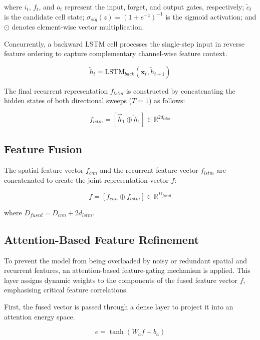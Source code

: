 \documentclass[a4paper,fleqn]{cas-sc}
\begin{document}
where $i_t$, $f_t$, and $o_t$ represent the input, forget, and output gates, respectively; $\tilde{c}_t$ is the candidate cell state; $\sigma_{sig}(z) = (1 + e^{-z})^{-1}$ is the sigmoid activation; and $\odot$ denotes element-wise vector multiplication.

Concurrently, a backward LSTM cell processes the single-step input in reverse feature ordering to capture complementary channel-wise feature context.

\begin{equation}
\overleftarrow{h}_t = \text{LSTM}_{back}(\mathbf{x}_t, \overleftarrow{h}_{t+1})
\end{equation}

The final recurrent representation $f_{lstm}$ is constructed by concatenating the hidden states of both directional sweeps ($T=1$) as follows:

\begin{equation}
f_{lstm} = [\overrightarrow{h}_1 \oplus \overleftarrow{h}_1] \in \mathbb{R}^{2 d_{lstm}}
\end{equation}

\subsection{Feature Fusion}

The spatial feature vector $f_{cnn}$ and the recurrent feature vector $f_{lstm}$ are concatenated to create the joint representation vector $f$:

\begin{equation}
f = [f_{cnn} \oplus f_{lstm}] \in \mathbb{R}^{D_{fused}}
\end{equation}

where $D_{fused} = D_{cnn} + 2 d_{lstm}$.

\subsection{Attention-Based Feature Refinement}

To prevent the model from being overloaded by noisy or redundant spatial and recurrent features, an attention-based feature-gating mechanism is applied. This layer assigns dynamic weights to the components of the fused feature vector $f$, emphasising critical feature correlations.

First, the fused vector is passed through a dense layer to project it into an attention energy space.

\begin{equation}
e = \tanh(W_a f + b_a)
\end{equation}
\end{document}
